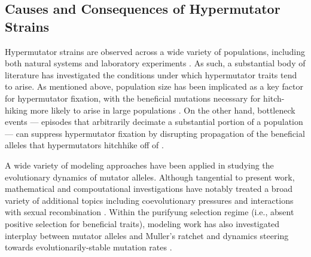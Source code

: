 \subsection{Causes and Consequences of Hypermutator Strains}

Hypermutator strains are observed across a wide variety of populations, including both natural systems and laboratory experiments \citep{sniegowski1997evolution,swings2017adaptive,maddamsetti2020divergent,cherry2018methylation,notleymcrobb2002enrichment,shaver2002fitness,voordeckers2015adaptation,leclerc1996high}.
As such, a substantial body of literature has investigated the conditions under which hypermutator traits tend to arise.
As mentioned above, population size has been implicated as a key factor for hypermutator fixation, with the beneficial mutations necessary for hitch-hiking more likely to arise in large populations \citep{chao1983competition}.
On the other hand, bottleneck events --- episodes that arbitrarily decimate a substantial portion of a population --- can suppress hypermutator fixation by disrupting propagation of the beneficial alleles that hypermutators hitchhike off of \citep{raynes2013effect}.

A wide variety of modeling approaches have been applied in studying the evolutionary dynamics of mutator alleles.
Although tangential to present work, mathematical and compoutational investigations have notably treated a broad variety of additional topics including coevolutionary pressures \citep{pal2007coevolution} and interactions with sexual recombination \citep{johnson1999beneficial}.
Within the purifyung selection regime (i.e., absent positive selection for beneficial traits), modeling work has also investigated interplay between mutator alleles and Muller's ratchet  \citep{soderberg2011kickstarting} and dynamics steering towards evolutionarily-stable mutation rates \citep{lynch2008cellular}.

